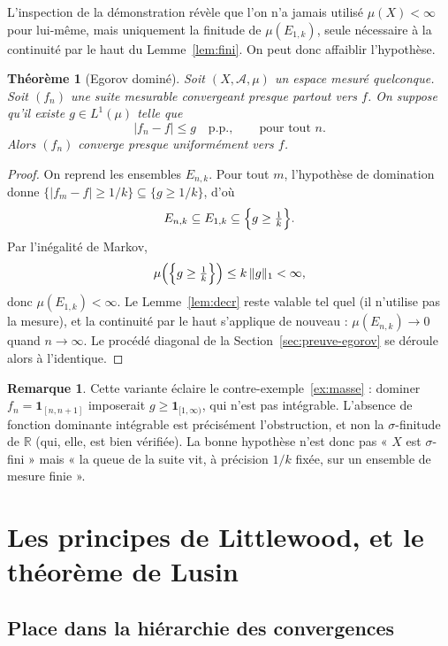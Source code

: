 \documentclass[11pt,a4paper]{article}
\theoremstyle{plain}
\newtheorem{theoreme}{Théorème}
\theoremstyle{definition}
\newtheorem{remarque}{Remarque}
\newcommand{\R}{\mathbb{R}}
\newcommand{\A}{\mathcal{A}}
\newcommand{\1}{\mathbf{1}}
\newcommand{\ind}[1]{\1_{#1}}
\newcommand{\abs}[1]{\left|#1\right|}
\newcommand{\pp}{\text{p.p.}}
\begin{document}
L'inspection de la démonstration révèle que l'on n'a jamais utilisé $\mu(X)<\infty$
pour lui-même, mais uniquement la finitude de $\mu(E_{1,k})$, seule nécessaire à la
continuité par le haut du Lemme~\ref{lem:fini}. On peut donc affaiblir l'hypothèse.

\begin{theoreme}[Egorov dominé]\label{th:domine}
Soit $(X,\A,\mu)$ un espace mesuré \emph{quelconque}. Soit $(f_n)$ une suite
mesurable convergeant presque partout vers $f$. On suppose qu'il existe
$g\in L^1(\mu)$ telle que
\[
  \abs{f_n-f}\le g\quad\pp,\qquad\text{pour tout }n.
\]
Alors $(f_n)$ converge presque uniformément vers $f$.
\end{theoreme}

\begin{proof}
On reprend les ensembles $E_{n,k}$. Pour tout $m$, l'hypothèse de domination donne
$\{\abs{f_m-f}\ge 1/k\}\subseteq\{g\ge 1/k\}$, d'où
\[
  E_{n,k}\subseteq E_{1,k}\subseteq\Bigl\{g\ge\tfrac1k\Bigr\}.
\]
Par l'inégalité de Markov,
\[
  \mu\Bigl(\Bigl\{g\ge\tfrac1k\Bigr\}\Bigr)\le k\,\lVert g\rVert_{1}<\infty,
\]
donc $\mu(E_{1,k})<\infty$. Le Lemme~\ref{lem:decr} reste valable tel quel
(il n'utilise pas la mesure), et la continuité par le haut s'applique de nouveau :
$\mu(E_{n,k})\to0$ quand $n\to\infty$. Le procédé diagonal de la
Section~\ref{sec:preuve-egorov} se déroule alors à l'identique.
\end{proof}

\begin{remarque}
Cette variante éclaire le contre-exemple~\ref{ex:masse} : dominer
$f_n=\ind{[n,n+1]}$ imposerait $g\ge\ind{[1,\infty)}$, qui n'est pas intégrable.
L'absence de fonction dominante intégrable est précisément l'obstruction, et non
la $\sigma$-finitude de $\R$ (qui, elle, est bien vérifiée). La bonne hypothèse
n'est donc pas « $X$ est $\sigma$-fini » mais « la queue de la suite vit, à
précision $1/k$ fixée, sur un ensemble de mesure finie ».
\end{remarque}

\section{Les principes de Littlewood, et le théorème de Lusin}

\subsection*{Place dans la hiérarchie des convergences}
\end{document}

